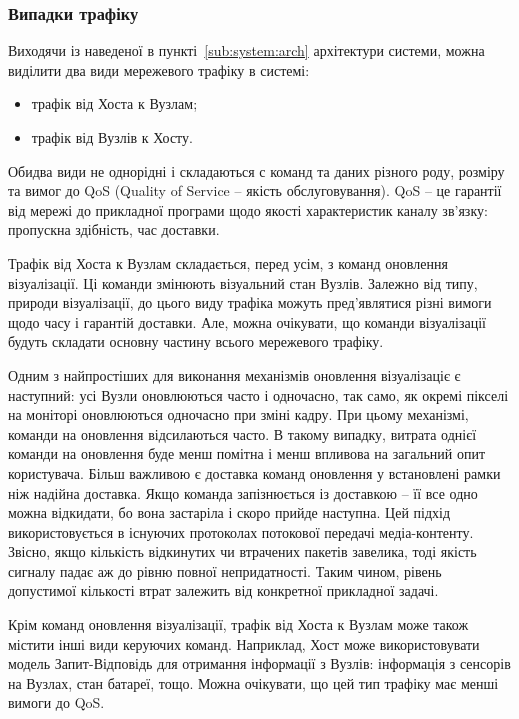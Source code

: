 \documentclass[a4paper,ukrainian,utf8,nocolumnsxix,floatsection,equationsection]{eskdtext}
\renewcommand\paragraph{\subsubsection}
\begin{document}
\paragraph{Випадки трафіку}
\label{par:traffic:cases}

Виходячи із наведеної в пункті~\ref{sub:system:arch} архітектури системи, можна виділити два види мережевого трафіку в системі:
\begin{itemize}
	\item трафік від Хоста к Вузлам;
	\item трафік від Вузлів к Хосту.
\end{itemize}

Обидва види не однорідні і складаються с команд та даних різного роду, розміру та вимог до QoS (Quality of Service – якість обслуговування). QoS – це гарантії від мережі до прикладної програми щодо якості характеристик каналу зв’язку: пропускна здібність, час доставки.

Трафік від Хоста к Вузлам складається, перед усім, з команд оновлення візуалізації. Ці команди змінюють візуальний стан Вузлів. Залежно від типу, природи візуалізації, до цього виду трафіка можуть пред’являтися різні вимоги щодо часу і гарантій доставки. Але, можна очікувати, що команди візуалізації будуть складати основну частину всього мережевого трафіку.

Одним з найпростіших для виконання механізмів оновлення візуалізаціє є наступний: усі Вузли оновлюються часто і одночасно, так само, як окремі пікселі на моніторі оновлюються одночасно при зміні кадру. При цьому механізмі, команди на оновлення відсилаються часто. В такому випадку, витрата однієї команди на оновлення буде менш помітна і менш впливова на загальний опит користувача. Більш важливою є доставка  команд оновлення у встановлені рамки ніж надійна доставка. Якщо команда запізнюється із доставкою – її все одно можна відкидати, бо вона застаріла і скоро прийде наступна. Цей підхід використовується в існуючих протоколах потокової передачі медіа-контенту. Звісно, якщо кількість відкинутих чи втрачених пакетів завелика, тоді якість сигналу падає аж до рівню повної непридатності. Таким чином, рівень допустимої кількості втрат залежить від конкретної прикладної задачі.

Крім команд оновлення візуалізації, трафік від Хоста к Вузлам може також містити інші види керуючих команд. Наприклад, Хост може використовувати модель Запит-Відповідь для отримання інформації з Вузлів: інформація з сенсорів на Вузлах, стан батареї, тощо. Можна очікувати, що цей тип трафіку має менші вимоги до QoS.
\end{document}
